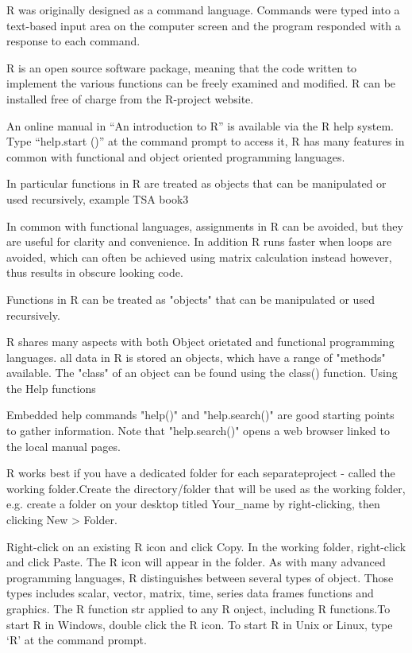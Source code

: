 \begin{frame} 
 

R was originally designed as a command language.  
Commands were typed into a text-based input area on the computer screen and the program responded with a response to each command.

R is an open source software package, meaning that the code written to implement the various functions can be freely examined and modified.
R can be installed free of charge from the R-project website.

An online manual in “An introduction to R” is available via the R help system. Type “help.start ()” at the command prompt to access it, R   has many features in common with functional and object oriented programming languages.



In particular functions in R are treated as objects that can be manipulated or used recursively, example TSA book3

In common with functional languages, assignments in R can be avoided, but they are useful for clarity and convenience. In addition R runs faster when loops are avoided, which can often be achieved using matrix calculation instead however, thus results in obscure looking code.

\end{frame}
\begin{frame}

Functions in R can be treated as "objects" that can be manipulated or used recursively.

R shares many aspects with both Object orietated and functional programming languages. all data in R is stored an objects, which have a range of "methods" available. The "class" of an object can be found using the class() function.
Using the Help functions

\end{frame}
\begin{frame}
Embedded help commands "help()" and "help.search()" are good starting points to gather information.
Note that "help.search()" opens a web browser linked to the local manual pages.
 

R works best if you have a dedicated folder for each separateproject - called the working folder.Create the directory/folder that will be used as the working folder, e.g. create a folder on your desktop titled Your_name by right-clicking, then clicking New > Folder. 
 
Right-click on an existing R icon and click Copy.   In the working folder, right-click and click Paste. The R icon will appear in the folder. As with many advanced programming languages, R distinguishes between several types of object. Those types includes scalar, vector, matrix, time, series data frames functions and graphics. The R function str applied to any R onject, including R functions.To start R in Windows, double click the R icon. To start R in Unix or Linux, type ‘R’ at the command prompt. 

\end{frame}
